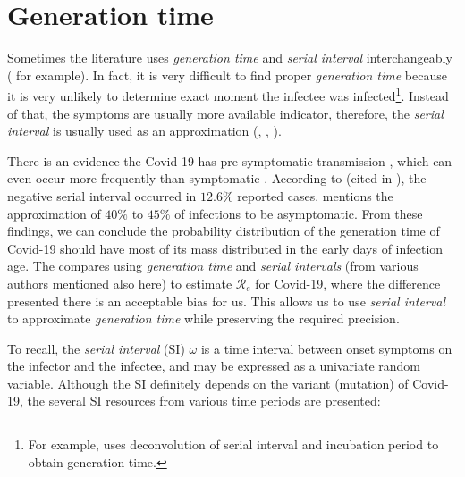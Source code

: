 \documentclass[
  digital, %
  oneside, %
  lof,     %
  lot,     %
]{fithesis4}
\begin{document}
\section{Generation time}

Sometimes the literature uses \textit{generation time} and \textit{serial interval} interchangeably (\cite{wallinga2004} for example).
In fact, it is very difficult to find proper \textit{generation time} because it is very unlikely to determine exact moment the infectee was infected\footnote{For example, \cite{knight2020} uses deconvolution of serial interval and incubation period to obtain generation time.}.
Instead of that, the symptoms are usually more available indicator, therefore, the \textit{serial interval} is usually used as an approximation (\cite{griffin2010}, \cite{najafi2020}, \cite{cori2013}).

There is an evidence the Covid-19 has pre-symptomatic transmission \cite{ma2020}, which can even occur more frequently than symptomatic \cite{nishiura2020}.
According to \cite{du2020} (cited in \cite{knight2020}), the negative serial interval occurred in $12.6\%$ reported cases.
\cite{oran2020} mentions the approximation of $40\%$ to $45\%$ of infections to be asymptomatic.
From these findings, we can conclude the probability distribution of the generation time of Covid-19 should have most of its mass distributed in the early days of infection age.
The \cite{knight2020} compares using \textit{generation time} and \textit{serial intervals} (from various authors mentioned also here) to estimate $\mathcal{R}_e$ for Covid-19, where the difference presented there is an acceptable bias for us.
This allows us to use \textit{serial interval} to approximate \textit{generation time} while preserving the required precision.

To recall, the \textit{serial interval} (SI) $\omega$ is a time interval between onset symptoms on the infector and the infectee, and may be expressed as a univariate random variable. 
Although the SI definitely depends on the variant (mutation) of Covid-19, the several SI resources from various time periods are presented:
\end{document}
